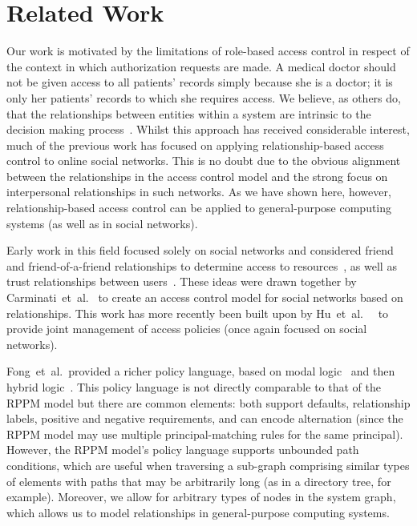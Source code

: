 \documentclass{article}
\begin{document}
\section{Related Work}\label{sec:related-work}
Our work is motivated by the limitations of role-based access control in respect of the context in which authorization requests are made.
A medical doctor should not be given access to all patients' records simply because she is a doctor; it is only her patients' records to which she requires access.
We believe, as others do, that the relationships between entities within a system are intrinsic to the decision making process~\cite{CarminatiFP09,ChengPS12passat,ChengPS12dbsec,Fong11,ZhangAGC09}.
Whilst this approach has received considerable interest, much of the previous work has focused on applying relationship-based access control to online social networks.
This is no doubt due to the obvious alignment between the relationships in the access control model and the strong focus on interpersonal relationships in such networks.
As we have shown here, however, relationship-based access control can be applied to general-purpose computing systems (as well as in social networks).

Early work in this field focused solely on social networks and considered {\sf friend} and {\sf friend-of-a-friend} relationships to determine access to resources~\cite{KrukGGWC06}, as well as trust relationships between users~\cite{AlViMa07}.
These ideas were drawn together by Carminati~et~al.~\cite{CarminatiFP09} to create an access control model for social networks based on relationships.
This work has more recently been built upon by Hu~et~al.~~\cite{HuAhJo13} to provide joint management of access policies (once again focused on social networks).

Fong~et~al.~provided a richer policy language, based on modal logic~\cite{BrunsFSH12,Fong11} and then hybrid logic~\cite{Fong_ESORICS09}.
This policy language is not directly comparable to that of the RPPM model but there are common elements: both support defaults, relationship labels, positive and negative requirements, and can encode alternation (since the RPPM model may use multiple principal-matching rules for the same principal).
However, the RPPM model's policy language supports unbounded path conditions, which are useful when traversing a sub-graph comprising similar types of elements with paths that may be arbitrarily long (as in a directory tree, for example).
Moreover, we allow for arbitrary types of nodes in the system graph, which allows us to model relationships in general-purpose computing systems.
\end{document}
